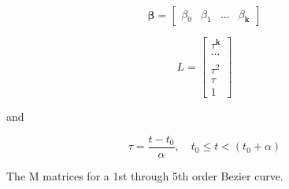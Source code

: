 \documentclass{article}
\begin{document}
    \begin{equation}
        \boldsymbol{\beta} = \begin{bmatrix} \beta_{0} & \beta_{1} & ... & \beta_{\textbf{k}}\end{bmatrix}
    \end{equation}
    
    \begin{equation}
        L = \begin{bmatrix} \tau^{\textbf{k}} \\ ... \\ \\ \tau^2 \\ \tau \\ 1 \end{bmatrix}
    \end{equation}
    
    and
    
    \begin{equation}
        \tau = \frac{t-t_0}{\alpha}, \quad t_0 \leq t < (t_0 + \alpha)
    \end{equation}
    
The M matrices for a 1st through 5th order Bezier curve.
\end{document}
